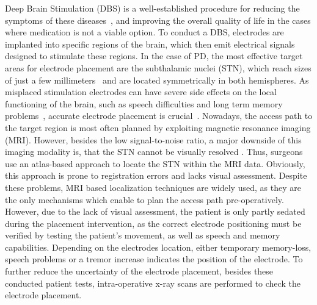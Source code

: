 \documentclass{vgtc}                          %
\begin{document}
Deep Brain Stimulation (DBS) is a well-established procedure for reducing the symptoms of these diseases~\cite{Ghika1998,Lindberg2002,Yianni2003,Benabid2009}, and improving the overall quality of life in the cases where medication is not a viable option. To conduct a DBS, electrodes are implanted into specific regions of the brain, which then emit electrical signals designed to stimulate these regions. In the case of PD, the most effective target areas for electrode placement are the subthalamic nuclei (STN), which reach sizes of just a few millimeters~\cite{Richter2004} and are located symmetrically in both hemispheres. As misplaced stimulation electrodes can have severe side effects on the local functioning of the brain, such as speech difficulties and long term memory problems~\cite{Astrom2010}, accurate electrode placement is crucial~\cite{Rodriguez-Oroz2005}. Nowadays, the access path to the target region is most often planned by exploiting magnetic resonance imaging (MRI). However, besides the low signal-to-noise ratio, a major downside of this imaging modality is, that the STN cannot be visually resolved \cite{Starr2002}. Thus, surgeons use an atlas-based approach to locate the STN within the MRI data. Obviously, this approach is prone to registration errors and lacks visual assessment. Despite these problems, MRI based localization techniques are widely used, as they are the only mechanisms which enable to plan the access path pre-operatively. However, due to the lack of visual assessment, the patient is only partly sedated during the placement intervention, as the correct electrode positioning must be verified by testing the patient's movement, as well as speech and memory capabilities. Depending on the electrodes location, either temporary memory-loss, speech problems or a tremor increase indicates the position of the electrode. To further reduce the uncertainty of the electrode placement, besides these conducted patient tests, intra-operative x-ray scans are performed to check the electrode placement.
\end{document}
